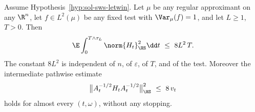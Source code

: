 \documentclass[../main.tex]{subfiles}
\begin{document}
\begin{theorem}
\label{thm:sol-lem-mm-stopped-window-source}
Assume Hypothesis~\ref{hyp:sol-sws-letwin}.  Let $\mu$ be any regular approximant on any
$\R^n$, let $f\in L^2(\mu)$ be any fixed test with $\Var_\mu(f)=1$, and let $L\ge1$,
$T>0$.  Then
\begin{equation}
  \E\int_0^{T\wedge\tau_L}\norm{H_t}_{\HS}^2\dd t\ \le\ 8L^2\,T .
  \label{eq:sol-sws-main}
\end{equation}
The constant $8L^2$ is independent of $n$, of $\varepsilon$, of $T$, and of the test.
Moreover the intermediate pathwise estimate
\begin{equation}
  \bigl\|A_t^{-1/2}H_tA_t^{-1/2}\bigr\|_{\HS}^2\ \le\ 8\,v_t
  \label{eq:sol-sws-whitened}
\end{equation}
holds for almost every $(t,\omega)$, without any stopping.
\end{theorem}
\end{document}
